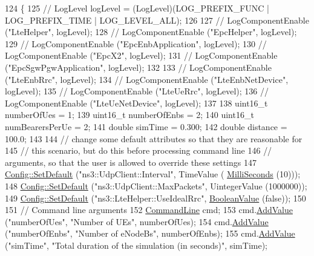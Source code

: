 \begin{DoxyCode}
124 \{
125   \textcolor{comment}{// LogLevel logLevel = (LogLevel)(LOG\_PREFIX\_FUNC | LOG\_PREFIX\_TIME | LOG\_LEVEL\_ALL);}
126 
127   \textcolor{comment}{// LogComponentEnable ("LteHelper", logLevel);}
128   \textcolor{comment}{// LogComponentEnable ("EpcHelper", logLevel);}
129   \textcolor{comment}{// LogComponentEnable ("EpcEnbApplication", logLevel);}
130   \textcolor{comment}{// LogComponentEnable ("EpcX2", logLevel);}
131   \textcolor{comment}{// LogComponentEnable ("EpcSgwPgwApplication", logLevel);}
132 
133   \textcolor{comment}{// LogComponentEnable ("LteEnbRrc", logLevel);}
134   \textcolor{comment}{// LogComponentEnable ("LteEnbNetDevice", logLevel);}
135   \textcolor{comment}{// LogComponentEnable ("LteUeRrc", logLevel);}
136   \textcolor{comment}{// LogComponentEnable ("LteUeNetDevice", logLevel);}
137 
138   uint16\_t numberOfUes = 1;
139   uint16\_t numberOfEnbs = 2;
140   uint16\_t numBearersPerUe = 2;
141   \textcolor{keywordtype}{double} simTime = 0.300;
142   \textcolor{keywordtype}{double} distance = 100.0;
143 
144   \textcolor{comment}{// change some default attributes so that they are reasonable for}
145   \textcolor{comment}{// this scenario, but do this before processing command line}
146   \textcolor{comment}{// arguments, so that the user is allowed to override these settings}
147   \hyperlink{group__config_ga2e7882df849d8ba4aaad31c934c40c06}{Config::SetDefault} (\textcolor{stringliteral}{"ns3::UdpClient::Interval"}, TimeValue (
      \hyperlink{group__timecivil_gaf26127cf4571146b83a92ee18679c7a9}{MilliSeconds} (10)));
148   \hyperlink{group__config_ga2e7882df849d8ba4aaad31c934c40c06}{Config::SetDefault} (\textcolor{stringliteral}{"ns3::UdpClient::MaxPackets"}, UintegerValue (1000000));
149   \hyperlink{group__config_ga2e7882df849d8ba4aaad31c934c40c06}{Config::SetDefault} (\textcolor{stringliteral}{"ns3::LteHelper::UseIdealRrc"}, 
      \hyperlink{classns3_1_1BooleanValue}{BooleanValue} (\textcolor{keyword}{false}));
150 
151   \textcolor{comment}{// Command line arguments}
152   \hyperlink{classns3_1_1CommandLine}{CommandLine} cmd;
153   cmd.\hyperlink{classns3_1_1CommandLine_addcfb546c7ad4c8bd0965654d55beb8e}{AddValue} (\textcolor{stringliteral}{"numberOfUes"}, \textcolor{stringliteral}{"Number of UEs"}, numberOfUes);
154   cmd.\hyperlink{classns3_1_1CommandLine_addcfb546c7ad4c8bd0965654d55beb8e}{AddValue} (\textcolor{stringliteral}{"numberOfEnbs"}, \textcolor{stringliteral}{"Number of eNodeBs"}, numberOfEnbs);
155   cmd.\hyperlink{classns3_1_1CommandLine_addcfb546c7ad4c8bd0965654d55beb8e}{AddValue} (\textcolor{stringliteral}{"simTime"}, \textcolor{stringliteral}{"Total duration of the simulation (in seconds)"}, simTime);

\end{DoxyCode}
